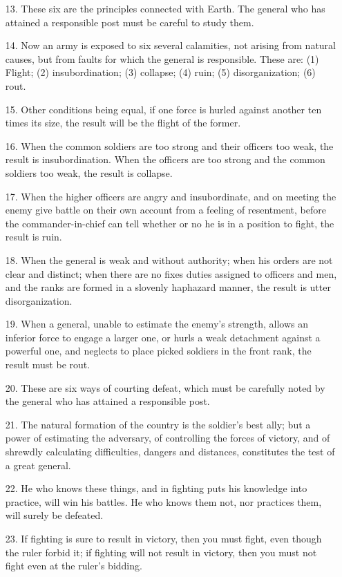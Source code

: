 \documentclass[11pt,openany]{memoir}
\newcommand{\enumeratemargin}{1.30em}
\begin{document}
\begin{enumerate}[leftmargin=\enumeratemargin]
\item[13.] These six are the principles connected with Earth. The general who has attained a responsible post must be careful to study them.
\item[14.] Now an army is exposed to six several calamities, not arising from natural causes, but from faults for which the general is responsible. These are: (1) Flight; (2) insubordination; (3) collapse; (4) ruin; (5) disorganization; (6) rout.
\item[15.] Other conditions being equal, if one force is hurled against another ten times its size, the result will be the flight of the former.
\item[16.] When the common soldiers are too strong and their officers too weak, the result is insubordination. When the officers are too strong and the common soldiers too weak, the result is collapse.
\item[17.] When the higher officers are angry and insubordinate, and on meeting the enemy give battle on their own account from a feeling of resentment, before the commander-in-chief can tell whether or no he is in a position to fight, the result is ruin.
\item[18.] When the general is weak and without authority; when his orders are not clear and distinct; when there are no fixes duties assigned to officers and men, and the ranks are formed in a slovenly haphazard manner, the result is utter disorganization.
\item[19.] When a general, unable to estimate the enemy's strength, allows an inferior force to engage a larger one, or hurls a weak detachment against a powerful one, and neglects to place picked soldiers in the front rank, the result must be rout.
\item[20.] These are six ways of courting defeat, which must be carefully noted by the general who has attained a responsible post.
\item[21.] The natural formation of the country is the soldier's best ally; but a power of estimating the adversary, of controlling the forces of victory, and of shrewdly calculating difficulties, dangers and distances, constitutes the test of a great general.
\item[22.] He who knows these things, and in fighting puts his knowledge into practice, will win his battles. He who knows them not, nor practices them, will surely be defeated.
\item[23.] If fighting is sure to result in victory, then you must fight, even though the ruler forbid it; if fighting will not result in victory, then you must not fight even at the ruler's bidding.

\end{enumerate}
\end{document}

